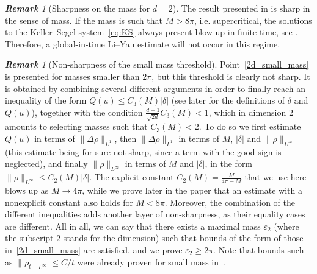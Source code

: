\documentclass[11pt,a4paper]{article}
\numberwithin{equation}{section}
\newcommand{\ee}{\varepsilon}
\theoremstyle{plain}
\theoremstyle{remark}
\newtheorem{remark}[theorem]{\bf Remark}
\begin{document}
\begin{remark}
    [Sharpness on the mass for $d = 2$]
    The result presented in  is sharp in the sense of mass. If the mass is such that $M > 8 \pi$, i.e. supercritical, the solutions to the Keller--Segel system~\eqref{eq:KS} always present blow-up in finite time, see \cite{Blanchet_Dolbeault_Perthame06}. Therefore, a global-in-time Li--Yau estimate will not occur in this regime. %
\end{remark}
\begin{remark}[Non-sharpness of the small mass threshold]
Point~\ref{2d_small_mass} is presented for masses smaller than
$2\pi$, but this threshold is clearly not sharp. It is obtained by
combining several different arguments in order to finally reach an
inequality of the form $Q(u)\le C_3(M)|\delta|$ (see later for the
definitions of $\delta$ and $Q(u)$), together with the condition
$\frac{d-1}{\sqrt{2d}}C_3(M)<1$, which in dimension $2$ amounts to
selecting masses such that $C_3(M)<2$. To do so we first estimate
$Q(u)$ in terms of $\|\Delta\rho\|_{L^1}$, then
$\|\Delta\rho\|_{L^1}$ in terms of $M$, $|\delta|$ and
$\|\rho\|_{L^\infty}$ (this estimate being for sure not sharp, since
a term with the good sign is neglected), and finally
$\|\rho\|_{L^\infty}$ in terms of $M$ and $|\delta|$, in the form
$\|\rho\|_{L^\infty}\le C_2(M)|\delta|$. The explicit constant
$C_2(M)=\frac{M}{4\pi-M}$ that we use here blows up as $M\to4\pi$,
while we prove later in the paper that an estimate with a
nonexplicit constant also holds for $M<8\pi$. Moreover, the
combination of the different inequalities adds another layer of
non-sharpness, as their equality cases are different. All in all, we
can say that there exists a maximal mass $\varepsilon_2$ (where the
subscript $2$ stands for the dimension) such that bounds of the form
of those in~\ref{2d_small_mass} are satisfied, and we prove
$\varepsilon_2\ge2\pi$. Note that bounds such as
$\|\rho_t\|_{L^\infty}\le C/t$ were already proven for small mass
in~\cite{Bedrossian_Rodriguez_Bertozzi11}.
\end{remark}
\end{document}
